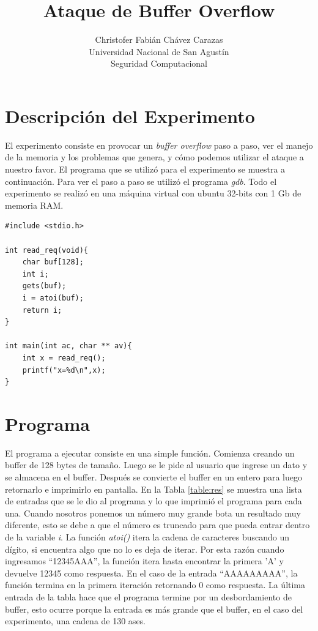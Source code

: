 \documentclass[a4paper,12pt]{article}
\begin{document}
\title{Ataque de Buffer Overflow}
\author{
Christofer Fabián Chávez Carazas \\
\small{Universidad Nacional de San Agustín} \\
\small{Seguridad Computacional}
}

\maketitle

\section{Descripción del Experimento}

El experimento consiste en provocar un \textit{buffer overflow} paso a paso, ver el manejo de la memoria y los
problemas que genera, y cómo podemos utilizar el ataque a nuestro favor. El programa que se utilizó para el
experimento se muestra a continuación. Para ver el paso a paso se utilizó el programa \textit{gdb}. Todo el experimento
se realizó en una máquina virtual con ubuntu 32-bits con 1 Gb de memoria RAM.

\begin{lstlisting}
#include <stdio.h>

int read_req(void){
	char buf[128];
	int i;
	gets(buf);
	i = atoi(buf);
	return i;
}

int main(int ac, char ** av){
	int x = read_req();
	printf("x=%d\n",x);
}
\end{lstlisting}

\section{Programa}

El programa a ejecutar consiste en una simple función. Comienza creando un buffer de 128 bytes de tamaño. Luego
se le pide al usuario que ingrese un dato y se almacena en el buffer. Después se convierte el buffer en un entero para
luego retornarlo e imprimirlo en pantalla. En la Tabla \ref{table:res} se muestra una lista de entradas que se 
le dio al programa y lo que imprimió el programa para cada una. Cuando nosotros ponemos un número muy grande
bota un resultado muy diferente, esto se debe a que el número es truncado para que pueda entrar dentro de la variable
\textit{i}. La función \textit{atoi()} itera la cadena de caracteres buscando un dígito, si encuentra algo que no
lo es deja de iterar. Por esta razón cuando ingresamos ``12345AAA'', la función itera hasta encontrar la primera 'A'
y devuelve 12345 como respuesta. En el caso de la entrada ``AAAAAAAAA'', la función termina en la primera iteración
retornando 0 como respuesta. La última entrada de la tabla hace que el programa termine por un desbordamiento de buffer,
esto ocurre porque la entrada es más grande que el buffer, en el caso del experimento, una cadena de 130 ases.
\end{document}
